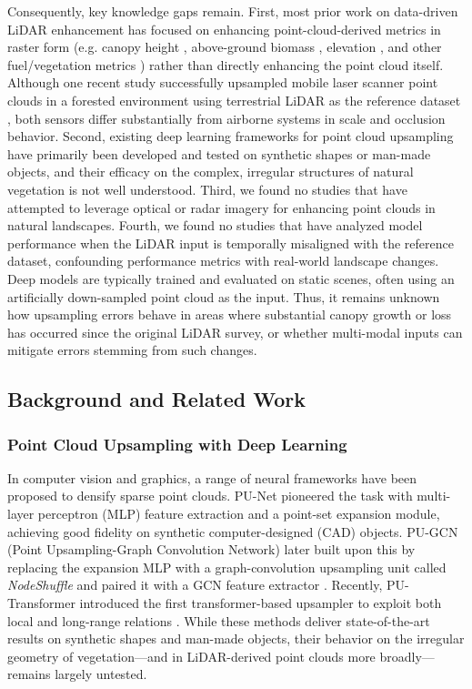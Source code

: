 \documentclass[preprints,article,accept,pdftex,moreauthors]{Definitions/mdpi}
\begin{document}
Consequently, key knowledge gaps remain. First, most prior work on data-driven LiDAR enhancement has focused on enhancing point-cloud-derived metrics in raster form (e.g. canopy height \cite{wilkes_mapping_2015, wagner_sub-meter_2024}, above-ground biomass \cite{shendryk2022fusing}, elevation \cite{li2023large}, and other fuel/vegetation metrics \cite{taneja2023up, gazzea2023high}) rather than directly enhancing the point cloud itself. Although one recent study successfully upsampled mobile laser scanner point clouds in a forested environment using terrestrial LiDAR as the reference dataset \cite{remijnse2024upsampling}, both sensors differ substantially from airborne systems in scale and occlusion behavior. Second, existing deep learning frameworks for point cloud upsampling have primarily been developed and tested on synthetic shapes or man-made objects, and their efficacy on the complex, irregular structures of natural vegetation is not well understood. Third, we found no studies that have attempted to leverage optical or radar imagery for enhancing point clouds in natural landscapes. Fourth, we found no studies that have analyzed model performance when the LiDAR input is temporally misaligned with the reference dataset, confounding performance metrics with real-world landscape changes. Deep models are typically trained and evaluated on static scenes, often using an artificially down-sampled point cloud as the input. Thus, it remains unknown how upsampling errors behave in areas where substantial canopy growth or loss has occurred since the original LiDAR survey, or whether multi-modal inputs can mitigate errors stemming from such changes.

\subsection{Background and Related Work}

\subsubsection{Point Cloud Upsampling with Deep Learning}

In computer vision and graphics, a range of neural frameworks have been proposed to densify sparse point clouds. PU-Net \cite{yu2018pu} pioneered the task with multi-layer perceptron (MLP) feature extraction and a point-set expansion module, achieving good fidelity on synthetic computer-designed (CAD) objects. PU-GCN (Point Upsampling-Graph Convolution Network) later built upon this by replacing the expansion MLP with a graph-convolution upsampling unit called \emph{NodeShuffle} and paired it with a GCN feature extractor \cite{qian2021pu}. Recently, PU-Transformer introduced the first transformer-based upsampler to exploit both local and long-range relations \cite{qiu2022pu}. While these methods deliver state-of-the-art results on synthetic shapes and man-made objects, their behavior on the irregular geometry of vegetation—and in LiDAR-derived point clouds more broadly—remains largely untested.
\end{document}
